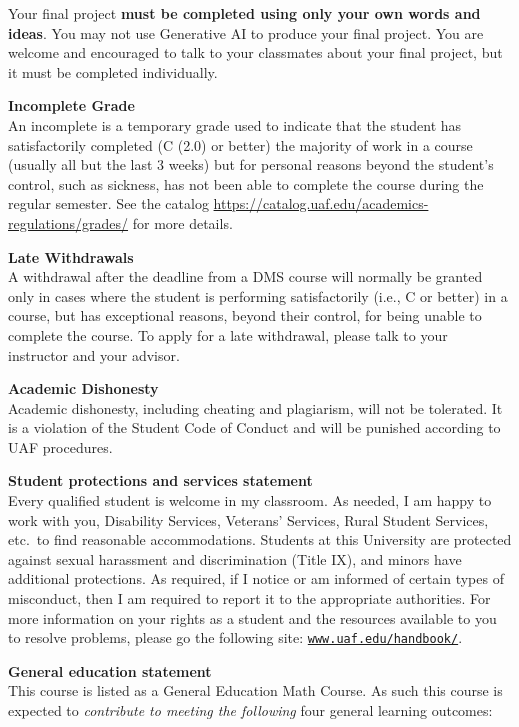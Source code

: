 \documentclass[11pt]{article}
\renewcommand{\emph}[1]{\textsf{\textbf{#1}}}
\newcommand{\localhead}[1]{\par\smallskip\textbf{#1} \smallskip\nobreak\\}%
\def\subheading#1{\localhead{\emph{#1}}}
\begin{document}
Your final project \emph{must be completed using only your own words and ideas}. You may not use Generative AI to produce your final project. You are welcome and encouraged to talk to your classmates about your final project, but it must be completed individually.

\subheading{Incomplete Grade} 
An incomplete is a temporary grade used to indicate that the student has satisfactorily completed (C (2.0) or better) the majority of work in a course (usually all but the last 3 weeks) but for personal reasons beyond the student's control, such as sickness, has not been able to complete the course during the regular semester. See the catalog \url{https://catalog.uaf.edu/academics-regulations/grades/} for more details.

\subheading{Late Withdrawals} 
A withdrawal after the deadline from a DMS course will normally be granted only in cases where the student is performing satisfactorily (i.e., C or better) in a course, but has exceptional reasons, beyond their control, for being unable to complete the course. To apply for a late withdrawal, please talk to your instructor and your advisor.

\subheading{Academic Dishonesty}
Academic dishonesty, including cheating and plagiarism, will not
be tolerated.  It is a violation of the Student Code of Conduct
and will be punished according to UAF procedures.

\subheading{Student protections and services statement}
Every qualified student is welcome in my classroom.  As needed, I am happy to work with you, Disability Services, Veterans' Services, Rural Student Services, etc.~to find reasonable accommodations.  Students at this University are protected against sexual harassment and discrimination (Title IX), and minors have additional protections.  As required, if I notice or am informed of certain types of misconduct, then I am required to report it to the appropriate authorities.  For more information on your rights as a student and the resources available to you to resolve problems, please go the following site: \href{https://www.uaf.edu/handbook/}{\texttt{www.uaf.edu/handbook/}}.


\strut

\subheading{General education statement}
This course is listed as a General Education Math Course.  As such this course is expected to \textsl{contribute to meeting the following} four general learning outcomes:
\end{document}
